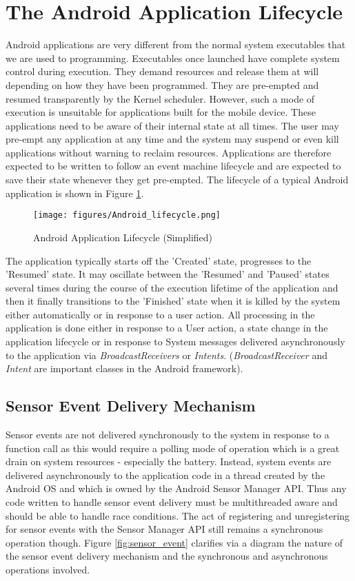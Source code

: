 \section{The Android Application Lifecycle\label{sec:android_lifecycle}}

Android applications are very different from the normal system executables
that we are used to programming. Executables once launched have complete 
system control during execution. They demand resources and release them at 
will depending on how they have been programmed. They are pre-empted and 
resumed transparently by the Kernel scheduler. However, such a mode of
execution is unsuitable for applications built for the mobile device. 
These applications need to be aware of their internal state at all times.
The user may pre-empt any application at any time and the system may 
suspend or even kill applications without warning to reclaim resources.
Applications are therefore expected to be written to follow an event machine 
lifecycle and are expected to save their state whenever they get pre-empted. 
The lifecycle of a typical Android application is shown in 
Figure \ref{fig:android_lifecycle}.


\begin{figure}
\centering
\texttt{[image: figures/Android\_lifecycle.png]}
\caption{Android Application Lifecycle (Simplified)\label{fig:android_lifecycle}}
\end{figure}

The application typically starts off the 'Created' state, progresses 
to the 'Resumed' state. It may oscillate between the 'Resumed' and 'Paused' states
several times during the course of the execution lifetime of the application 
and then it finally transitions to the 'Finished' state when it is killed by 
the system either automatically or in response to a user action. All 
processing in the application is done either in response to a User action, 
a state change in the application lifecycle or in response to System 
messages delivered asynchronously to the application via \emph{BroadcastReceivers} 
or \emph{Intents}. (\emph{BroadcastReceiver} and \emph{Intent} are important
classes in the Android framework).

\subsection{Sensor Event Delivery Mechanism}

Sensor events are not delivered synchronously to the system in response to 
a function call as this would require a polling mode of operation which 
is a great drain on system resources - especially the battery. Instead, 
system events are delivered asynchronously to the application code 
in a thread created by the Android OS and which is owned by the 
Android Sensor Manager API. Thus any code written to handle sensor event 
delivery must be multithreaded aware and should be able to handle 
race conditions. The act of registering and unregistering for sensor events
with the Sensor Manager API still remains a synchronous operation though.
Figure \ref{fig:sensor_event} clarifies via a diagram the nature of the 
sensor event delivery mechanism and the synchronous and asynchronous operations
involved.

